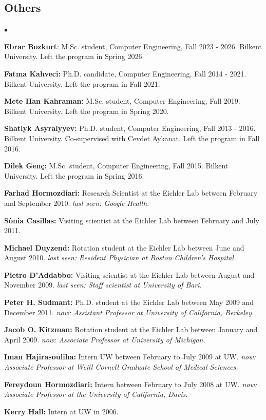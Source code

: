 \documentclass[margin,line]{res}
\newenvironment{list2}{
  \begin{list}{$\bullet$}{%
      \setlength{\itemsep}{0.1cm}
      \setlength{\parsep}{0in} \setlength{\parskip}{0in}
      \setlength{\topsep}{0in} \setlength{\partopsep}{0in} 
      \setlength{\leftmargin}{0.2in}}}{\end{list}}
\begin{document}
\begin{resume}
\vspace*{-.4cm}
\subsection{\small \sc Others}
\begin{list2}
  \item 
  \textbf{Ebrar Bozkurt}: M.Sc. student, Computer Engineering, Fall 2023 - 2026. Bilkent University. Left the program in Spring 2026.
\item
  {\bf Fatma Kahveci:} Ph.D. candidate, Computer Engineering, Fall 2014 - 2021. 
  Bilkent University. Left the program in Fall 2021.
\item
  {\bf Mete Han Kahraman:} M.Sc. student, Computer Engineering, Fall 2019.  
  Bilkent University. Left the program in Spring 2020.
\item
  {\bf Shatlyk Asyralyyev:} Ph.D. student, Computer Engineering, Fall 2013 - 2016.
  Bilkent University. Co-supervised with Cevdet Aykanat. Left the program in Fall 2016.
\item
{\bf Dilek Genç:} M.Sc. student, Computer Engineering, Fall 2015.
  Bilkent University. Left the program in Spring 2016. 
\item
  {\bf Farhad Hormozdiari:} Research Scientist at the Eichler Lab between February and September 2010.
  {\it last seen: Google Health.}
\item
  {\bf S\`{o}nia Casillas:} Visiting scientist at the Eichler Lab between February and July 2011.
\item
  {\bf Michael Duyzend:} Rotation student at the Eichler Lab between June and August 2010.
  {\it last seen:  Resident Physician at Boston Children's Hospital.}
\item
  {\bf Pietro D'Addabbo:} Visiting scientist at the Eichler Lab between August and November 2009.
  {\it last seen: Staff scientist at University of Bari.}
\item
  {\bf Peter H. Sudmant:} Ph.D. student at the Eichler Lab between May 2009 and December 2011.
  {\it now: Assistant Professor at University of California, Berkeley.}
\item
  {\bf Jacob O. Kitzman:} Rotation student at the Eichler Lab between January and April 2009.
  {\it now: Associate Professor at University of Michigan.}
\item
  {\bf Iman Hajirasouliha:}  Intern UW between February to July 2009 at UW.
  {\it now: Associate Professor at Weill Cornell Graduate School of Medical Sciences.}
\item
  {\bf Fereydoun Hormozdiari:} Intern between February to July 2008 at UW. 
  {\it now: Associate Professor at the University of California, Davis.}
\item
  {\bf Kerry Hall:} Intern at UW in 2006.  
\end{list2}



\end{resume}
\end{document}
